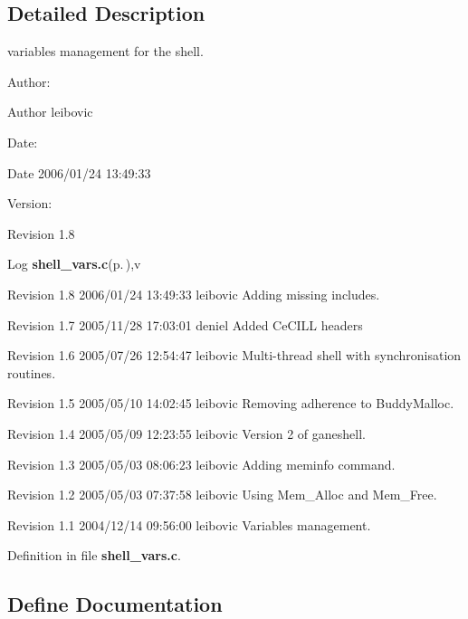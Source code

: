 \subsection{Detailed Description}
variables management for the shell. 

\begin{Desc}
\item[Author:]\begin{Desc}
\item[Author]leibovic \end{Desc}
\end{Desc}
\begin{Desc}
\item[Date:]\begin{Desc}
\item[Date]2006/01/24 13:49:33 \end{Desc}
\end{Desc}
\begin{Desc}
\item[Version:]\begin{Desc}
\item[Revision]1.8 \end{Desc}
\end{Desc}
\begin{Desc}
\item[Log]{\bf shell\_\-vars.c}{\rm (p.\,\pageref{shell__vars_8c})},v \end{Desc}
Revision 1.8 2006/01/24 13:49:33 leibovic Adding missing includes.

Revision 1.7 2005/11/28 17:03:01 deniel Added Ce\-CILL headers

Revision 1.6 2005/07/26 12:54:47 leibovic Multi-thread shell with synchronisation routines.

Revision 1.5 2005/05/10 14:02:45 leibovic Removing adherence to Buddy\-Malloc.

Revision 1.4 2005/05/09 12:23:55 leibovic Version 2 of ganeshell.

Revision 1.3 2005/05/03 08:06:23 leibovic Adding meminfo command.

Revision 1.2 2005/05/03 07:37:58 leibovic Using Mem\_\-Alloc and Mem\_\-Free.

Revision 1.1 2004/12/14 09:56:00 leibovic Variables management.

Definition in file {\bf shell\_\-vars.c}.

\subsection{Define Documentation}
